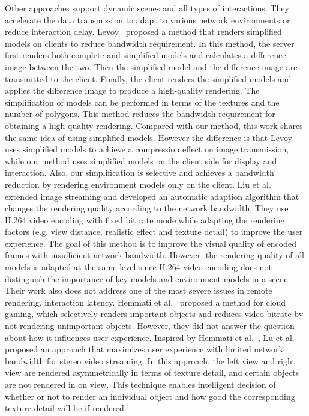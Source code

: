 Other approaches support dynamic scenes and all types of interactions. They accelerate the data transmission to adapt to various network environments or reduce interaction delay.
Levoy~\cite{levoy1995} proposed a method that renders simplified models on clients to reduce bandwidth requirement. In this method, the server first renders both complete and simplified models and calculates a difference image between the two. Then the simplified model and the difference image are transmitted to the client. Finally, the client renders the simplified models and applies the difference image to produce a high-quality rendering. The simplification of models can be performed in terms of the textures and the number of polygons. This method reduces the bandwidth requirement for obtaining a high-quality rendering. Compared with our method, this work shares the same idea of using simplified models. However the difference is that Levoy~\cite{levoy1995} uses simplified models to achieve a compression effect on image transmission, while our method uses simplified models on the client side for display and interaction. Also, our simplification is selective and achieves a bandwidth reduction by rendering environment models only on the client.
Liu et al.~\cite{liu2014} extended image streaming and developed an automatic adaption algorithm that changes the rendering quality according to the network bandwidth. They use H.264 video encoding with fixed bit rate mode while adapting the rendering factors (e.g. view distance, realistic effect and texture detail) to improve the user experience. The goal of this method is to improve the visual quality of encoded frames with insufficient network bandwidth.
However, the rendering quality of all models is adapted at the same level since H.264 video encoding does not distinguish the importance of key models and environment models in a scene. Their work also does not address one of the most severe issues in remote rendering, interaction latency.
Hemmati et al.~\cite{hemmati2013bitrate} proposed a method for cloud gaming, which selectively renders important objects and reduces video bitrate by not rendering unimportant objects. However, they did not answer the question about how it influences user experience.
Inspired by Hemmati et al.~\cite{hemmati2013bitrate}, Lu et al.~\cite{lu2017selective} proposed an approach that maximizes user experience with limited network bandwidth for stereo video streaming. In this approach, the left view and right view are rendered asymmetrically in terms of texture detail, and certain objects are not rendered in on view. This technique enables intelligent decision of whether or not to render an individual object and how good the corresponding texture detail will be if rendered.

